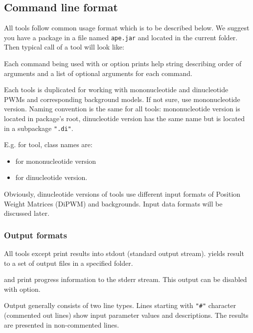 \subsection{Command line format}
All tools follow common usage format which is to be described below. We suggest you have a package in a file named \texttt{ape.jar} and located in the current folder. Then typical call of a tool will look like:\par
\texttt{}

Each command being used with  or  option prints help string describing order of arguments and a list of optional arguments for each command.

Each tools is duplicated for working with mononucleotide and dinucleotide PWMs and corresponding background models. If not sure, use mononucleotide version. Naming convention is the same for all tools: mononucleotide version is located in package's root, dinucleotide version has the same name but is located in a subpackage \texttt{".di"}.

E.g. for  tool, class names are:
\begin{itemize}
\item{} for mononucleotide version
\item{} for dinucleotide version.
\end{itemize}

Obviously, dinucleotide versions of tools use different input formats of Position Weight Matrices (DiPWM) and backgrounds. Input data formats will be discussed later.


\subsubsection{Output formats}

All tools except  print results into stdout (standard output stream).
 yields result to a set of output files in a specified folder. 

 and  print progress information to the stderr stream. This output can be disabled with  option.

Output generally consists of two line types. Lines starting with \texttt{"\#"} character (commented out lines) show 
input parameter values and descriptions. The results are presented in non-commented lines.
